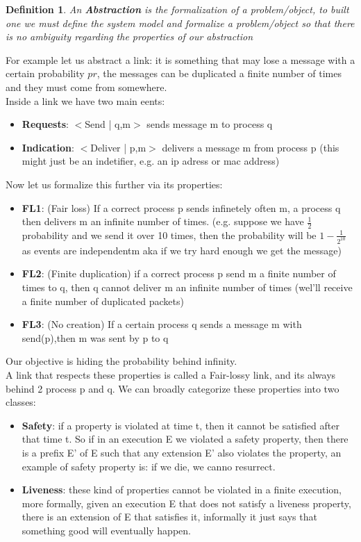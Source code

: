 \documentclass[11pt, a4paper]{article}
\newtheorem{defn}{Definition}
\begin{document}
\begin{defn}
    An \textbf{Abstraction} is the formalization of a problem/object, to built one we must define the system model and formalize a problem/object so that there is no ambiguity regarding the properties of our abstraction
\end{defn}
For example let us abstract a link: it is something that may lose a message with a certain probability $pr$, the messages can be duplicated a finite number of times and they must come from somewhere.\\
Inside a link we have two main eents:
\begin{itemize}
    \item \textbf{Requests}: $<$Send | q,m$>$ sends message m to process q
    \item \textbf{Indication}: $<$Deliver | p,m$>$ delivers a message m from process p (this might just be an indetifier, e.g. an ip adress or mac address)
\end{itemize}
Now let us formalize this further via its properties:
\begin{itemize}
    \item \textbf{FL1}: (Fair loss) If a correct process p sends infinetely often m, a process q then delivers m an infinite number of times. (e.g. suppose we have $\frac{1}{2}$ probability and we send it over 10 times, then the probability will be $1 - \frac{1}{2^{10}}$ as events are independentm aka if we try hard enough we get the message)
    \item \textbf{FL2}: (Finite duplication) if a correct process p send m a finite number of times to q, then q cannot deliver m an infinite number of times (wel'll receive a finite number of duplicated packets)
    \item \textbf{FL3}: (No creation) If a certain process q sends a message m with send(p),then m was sent by p to q
\end{itemize}
Our objective is hiding the probability behind infinity.\\
A link that respects these properties is called a Fair-lossy link, and its always behind 2 process p and q. We can broadly categorize these properties into two classes:
\begin{itemize}
    \item \textbf{Safety}: if a property is violated at time t, then it cannot be satisfied after that time t. So if in an execution E we violated a safety property, then there is a prefix E' of E such that any extension E' also violates the property, an example of safety property is: if we die, we canno resurrect.
    \item \textbf{Liveness}: these kind of properties cannot be violated in a finite execution, more formally, given an execution E that does not satisfy a liveness property, there is an extension of E that satisfies it, informally it just says that something good will eventually happen.
\end{itemize}
\end{document}
